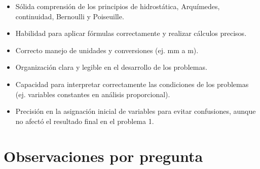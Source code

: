 \documentclass[11pt,a4paper]{article}
\begin{document}
\vspace{4pt}
\begin{minipage}[t]{0.48\linewidth}
  \begin{tcolorbox}[cajaFortaleza, title={Fortalezas}]
\begin{itemize}[leftmargin=1.5em, itemsep=2pt]
  \item Sólida comprensión de los principios de hidrostática, Arquímedes, continuidad, Bernoulli y Poiseuille.
  \item Habilidad para aplicar fórmulas correctamente y realizar cálculos precisos.
  \item Correcto manejo de unidades y conversiones (ej. mm a m).
  \item Organización clara y legible en el desarrollo de los problemas.
  \item Capacidad para interpretar correctamente las condiciones de los problemas (ej. variables constantes en análisis proporcional).
\end{itemize}
  \end{tcolorbox}
\end{minipage}
\hfill
\begin{minipage}[t]{0.48\linewidth}
  \begin{tcolorbox}[cajaMejora, title={Areas de mejora}]
\begin{itemize}[leftmargin=1.5em, itemsep=2pt]
  \item Precisión en la asignación inicial de variables para evitar confusiones, aunque no afectó el resultado final en el problema 1.
\end{itemize}
  \end{tcolorbox}
\end{minipage}

\section*{Observaciones por pregunta}
\end{document}
